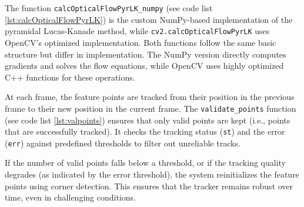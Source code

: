 \documentclass[11pt, conference, letterpaper]{IEEEtran}
\begin{document}
The function \texttt{calcOpticalFlowPyrLK\_numpy} (see code list \ref{lst:calcOpticalFlowPyrLK}) is the custom NumPy-based implementation of the pyramidal Lucas-Kanade method, while \texttt{cv2.calcOpticalFlowPyrLK} uses OpenCV's optimized implementation. Both functions follow the same basic structure but differ in implementation. The NumPy version directly computes gradients and solves the flow equations, while OpenCV uses highly optimized C++ functions for these operations.

At each frame, the feature points are tracked from their position in the previous frame to their new position in the current frame. The \texttt{validate\_points} function (see code list \ref{lst:valpoints}) ensures that only valid points are kept (i.e., points that are successfully tracked). It checks the tracking status (\texttt{st}) and the error (\texttt{err}) against predefined thresholds to filter out unreliable tracks.

If the number of valid points falls below a threshold, or if the tracking quality degrades (as indicated by the error threshold), the system reinitializes the feature points using corner detection. This ensures that the tracker remains robust over time, even in challenging conditions.

\bigskip
\end{document}
